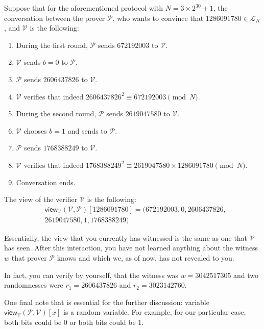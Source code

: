 \documentclass[../lecture-notes.tex]{subfiles}
\begin{document}
\begin{example}
    Suppose that for the aforementioned protocol with $N=3 \times 2^{30} + 1$, the conversation between the prover $\mathcal{P}$, who wants to convince that $1286091780 \in \mathcal{L}_R$, and $\mathcal{V}$ is the following:
    \begin{enumerate}
        \item During the first round, $\mathcal{P}$ sends $672192003$ to $\mathcal{V}$.
        \item $\mathcal{V}$ sends $b=0$ to $\mathcal{P}$.
        \item $\mathcal{P}$ sends $2606437826$ to $\mathcal{V}$.
        \item $\mathcal{V}$ verifies that indeed $2606437826^2 \equiv 672192003 \pmod{N}$.
        \item During the second round, $\mathcal{P}$ sends $2619047580$ to $\mathcal{V}$.
        \item $\mathcal{V}$ chooses $b=1$ and sends to $\mathcal{P}$.
        \item $\mathcal{P}$ sends $1768388249$ to $\mathcal{V}$.
        \item $\mathcal{V}$ verifies that indeed $1768388249^2 \equiv 2619047580 \times 1286091780 \pmod{N}$.
        \item Conversation ends.
    \end{enumerate}

    The view of the verifier $\mathcal{V}$ is the following: 
    \begin{equation*}
        \begin{aligned}
            &\mathsf{view}_{\mathcal{V}}(\mathcal{V}, \mathcal{P})[1286091780] = (672192003, 0, 2606437826, \\
            & 2619047580, 1, 1768388249)            
        \end{aligned}
    \end{equation*}

    Essentially, the view that you currently has witnessed is the same as one that $\mathcal{V}$ has seen. After this interaction, you have not learned anything about the witness $w$ that prover $\mathcal{P}$ knows and which we, as of now, has not revealed to you.

    In fact, you can verify by yourself, that the witness was $w = 3042517305$ and two randomnesses were $r_1 = 2606437826$ and $r_2 = 3023142760$.

    One final note that is essential for the further discussion: variable $\mathsf{view}_{\mathcal{V}}(\mathcal{P}, \mathcal{V})[x]$ is a random variable. For example, for our particular case, both bits could be $0$ or both bits could be $1$. 
\end{example}
\end{document}
